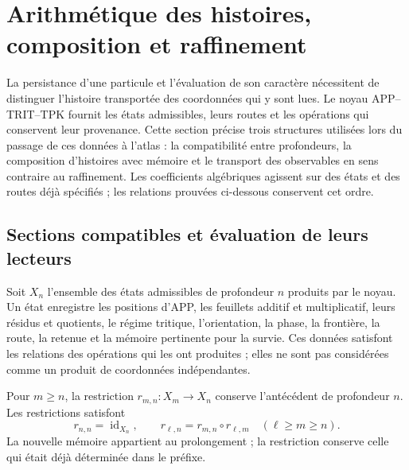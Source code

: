 \section{Arithmétique des histoires, composition et raffinement}
\label{vi:vi:hist:seccion-principal}

La persistance d’une particule et l’évaluation de son caractère nécessitent
de distinguer l’histoire transportée des coordonnées qui y sont lues.
Le noyau APP--TRIT--TPK fournit les états admissibles, leurs routes et
les opérations qui conservent leur provenance. Cette section précise trois
structures utilisées lors du passage de ces données à l’atlas : la compatibilité
entre profondeurs, la composition d’histoires avec mémoire et le
transport des observables en sens contraire au raffinement.
Les coefficients algébriques agissent sur des états et des routes déjà spécifiés ;
les relations prouvées ci-dessous conservent cet ordre.

\subsection{Sections compatibles et évaluation de leurs lecteurs}
\label{vi:hist:seccion}

Soit \(X_n\) l’ensemble des états admissibles de profondeur \(n\)
produits par le noyau. Un état enregistre les positions d’APP, les
feuillets additif et multiplicatif, leurs résidus et quotients, le régime
tritique, l’orientation, la phase, la frontière, la route, la retenue et la
mémoire pertinente pour la survie. Ces données satisfont les
relations des opérations qui les ont produites ; elles ne sont pas considérées comme un
produit de coordonnées indépendantes.

Pour \(m\ge n\), la restriction
\(r_{m,n}:X_m\longrightarrow X_n\) conserve l’antécédent de profondeur
\(n\). Les restrictions satisfont
\begin{equation}
 r_{n,n}=\operatorname{id}_{X_n},\qquad
 r_{\ell,n}=r_{m,n}\circ r_{\ell,m}
 \quad(\ell\ge m\ge n).
 \label{vi:vi:hist:restricciones}
\end{equation}
La nouvelle mémoire appartient au prolongement ; la restriction conserve celle
qui était déjà déterminée dans le préfixe.

